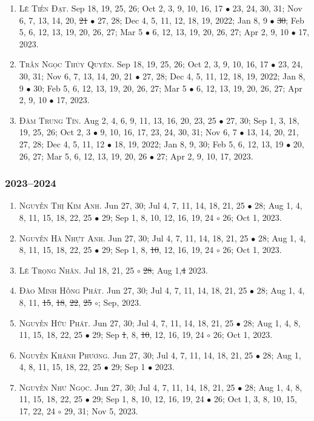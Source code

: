\documentclass{article}
\begin{document}
\begin{enumerate}
	\item \textsc{Lê Tiến Đạt.} {\sf[In]} Sep 18, 19, 25, 26; Oct 2, 3, 9, 10, 16, 17 $\bullet$ 23, 24, 30, 31; Nov 6, 7, 13, 14, 20, \st{21} $\bullet$ 27, 28; Dec 4, 5, 11, 12, 18, 19, 2022; Jan 8, 9 $\bullet$ \st{30}; Feb 5, 6, 12, 13, 19, 20, 26, 27; Mar 5 $\bullet$ 6, 12, 13, 19, 20, 26, 27; Apr 2, 9, 10 $\bullet$ 17, 2023.
	\item \textsc{Trần Ngọc Thúy Quyên.} {\sf[In]} Sep 18, 19, 25, 26; Oct 2, 3, 9, 10, 16, 17 $\bullet$ 23, 24, 30, 31; Nov 6, 7, 13, 14, 20, 21 $\bullet$ 27, 28; Dec 4, 5, 11, 12, 18, 19, 2022; Jan 8, 9 $\bullet$ 30; Feb 5, 6, 12, 13, 19, 20, 26, 27; Mar 5 $\bullet$ 6, 12, 13, 19, 20, 26, 27; Apr 2, 9, 10 $\bullet$ 17, 2023.
	\item \textsc{Đàm Trung Tín.} {\sf[In]} Aug 2, 4, 6, 9, 11, 13, 16, 20, 23, 25 $\bullet$ 27, 30; Sep 1, 3, 18, 19, 25, 26; Oct 2, 3 $\bullet$ 9, 10, 16, 17, 23, 24, 30, 31; Nov 6, 7 $\bullet$ 13, 14, 20, 21, 27, 28; Dec 4, 5, 11, 12 $\bullet$ 18, 19, 2022; Jan 8, 9, 30; Feb 5, 6, 12, 13, 19 $\bullet$ 20, 26, 27; Mar 5, 6, 12, 13, 19, 20, 26 $\bullet$ 27; Apr 2, 9, 10, 17, 2023. {\sf[Out]}
\end{enumerate}

\subsubsection{2023--2024}

\begin{enumerate}
	\item \textsc{Nguyễn Thị Kim Anh.} {\sf[In]} Jun 27, 30; Jul 4, 7, 11, 14, 18, 21, 25 $\bullet$ 28; Aug 1, 4, 8, 11, 15, 18, 22, 25 $\bullet$ 29; Sep 1, 8, 10, 12, 16, 19, 24 $\circ$ 26; Oct 1, 2023.
	\item \textsc{Nguyễn Hà Nhựt Anh.} {\sf[In]} Jun 27, 30; Jul 4, 7, 11, 14, 18, 21, 25 $\bullet$ 28; Aug 1, 4, 8, 11, 15, 18, 22, 25 $\bullet$ 29; Sep 1, 8, \st{10}, 12, 16, 19, 24 $\circ$ 26; Oct 1, 2023.
	\item \textsc{Lê Trọng Nhân.} {\sf[In]} Jul 18, 21, 25 $\circ$ \st{28}; Aug 1,\st{4} 2023. \sf{[Out]}
	\item \textsc{Đào Minh Hồng Phát.} {\sf[In]} Jun 27, 30; Jul 4, 7, 11, 14, 18, 21, 25 $\bullet$ 28; Aug 1, 4, 8, 11, \st{15}, \st{18}, \st{22}, \st{25} $\circ$; Sep, 2023. \sf{[Out]}
	\item \textsc{Nguyễn Hữu Phát.} {\sf[In]} Jun 27, 30; Jul 4, 7, 11, 14, 18, 21, 25 $\bullet$ 28; Aug 1, 4, 8, 11, 15, 18, 22, 25 $\bullet$ 29; Sep \st{1}, 8, \st{10}, 12, 16, 19, 24 $\circ$ 26; Oct 1, 2023.
	\item \textsc{Nguyễn Khánh Phương.} {\sf[In]} Jun 27, 30; Jul 4, 7, 11, 14, 18, 21, 25 $\bullet$ 28; Aug 1, 4, 8, 11, 15, 18, 22, 25 $\bullet$ 29; Sep 1 $\bullet$ 2023. \sf{[Out]}
	\item \textsc{Nguyễn Như Ngọc.} {\sf[In]} Jun 27, 30; Jul 4, 7, 11, 14, 18, 21, 25 $\bullet$ 28; Aug 1, 4, 8, 11, 15, 18, 22, 25 $\bullet$ 29; Sep 1, 8, 10, 12, 16, 19, 24 $\bullet$ 26; Oct 1, 3, 8, 10, 15, 17, 22, 24 $\circ$ 29, 31; Nov 5, 2023.
\end{enumerate}
\end{document}
